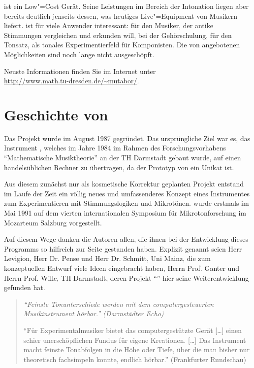 \mutabor{} ist ein Low"=Cost Gerät. Seine Leistungen im 
Bereich der Intonation liegen aber bereits deutlich jenseits 
dessen, was heutiges Live"=Equipment von Musikern liefert. \mutabor{} 
ist für viele Anwender interessant: für den Musiker, der 
antike Stimmungen vergleichen und erkunden will, bei der Gehörschulung, 
für den Tonsatz, als tonales Experimentierfeld für Komponisten. 
Die von \mutabor{} angebotenen Möglichkeiten sind noch lange 
nicht ausgeschöpft.

\begin{center}
Neuste Informationen finden Sie im Internet unter\\
{\url{http://www.math.tu-dresden.de/~mutabor/}}.
\end{center}

\section{Geschichte von \mutabor}

Das Projekt \mutabor[~II] wurde im August 1987 gegründet. Das
ursprüngliche Ziel war es, das Instrument \mutabor{}, welches im Jahre
1984 im Rahmen des Forschungsvorhabens "`Mathematische Musiktheorie"'
an der TH Darmstadt gebaut wurde, auf einen handelsüblichen Rechner zu
übertragen, da der Prototyp von \mutabor{} ein Unikat ist.

Aus diesem zunächst nur als kosmetische Korrektur geplanten 
Projekt entstand im Laufe der Zeit ein völlig neues und umfassenderes 
Konzept eines Instrumentes zum Experimentieren mit Stimmungslogiken 
und Mikrotönen. \mutabor[~II] wurde erstmals im Mai 1991 
auf dem vierten internationalen Symposium für Mikrotonforschung 
im Mozarteum Salzburg vorgestellt.

Auf diesem Wege danken die Autoren allen, die ihnen bei der
Entwicklung dieses Programms so hilfreich zur Seite gestanden haben.
Explizit genannt seien Herr Levigion, Herr Dr. Pense und Herr Dr.
Schmitt, Uni Mainz, die zum konzeptuellen Entwurf viele Ideen
eingebracht haben, Herrn Prof. Ganter und Herrn Prof. Wille, TH
Darmstadt, deren Projekt "`\mutabor{}"' hier seine Weiterentwicklung
gefunden hat.

\begin{quotation}\itshape
"`Feinste Tonunterschiede werden mit dem computergesteuerten 
Musikinstrument \mutabor[~II] hörbar."' (Darmstädter Echo)

"`Für Experimentalmusiker bietet das computergestützte 
Gerät [\dots{}] einen schier unerschöpflichen Fundus für eigene 
Kreationen. [\dots{}] Das Instrument macht feinste Tonabfolgen in 
die Höhe oder Tiefe, über die man bisher nur theoretisch 
fachsimpeln konnte, endlich hörbar."' (Frankfurter Rundschau)
\end{quotation}


